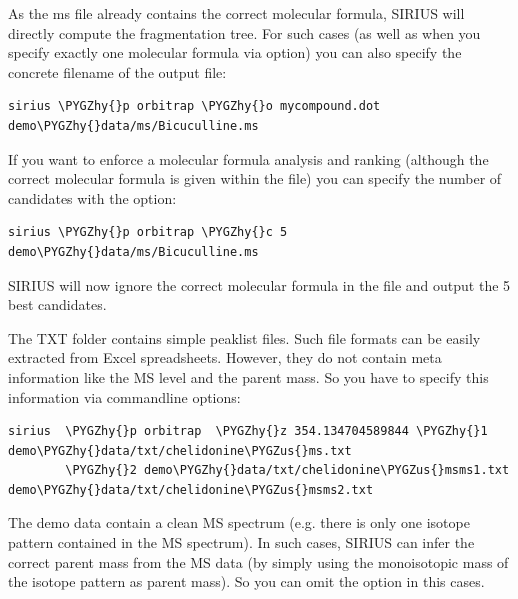 \documentclass[letterpaper,10pt,openany,oneside]{sphinxmanual}
\def\PYGZus{\char`\_}
\def\PYGZhy{\char`\-}
\begin{document}
As the ms file already contains the correct molecular formula, SIRIUS will
directly compute the fragmentation tree. For such cases (as well as when you
specify exactly one molecular formula via  option) you can also
specify the concrete filename of the output file:

\begin{Verbatim}[commandchars=\\\{\}]
sirius \PYGZhy{}p orbitrap \PYGZhy{}o mycompound.dot demo\PYGZhy{}data/ms/Bicuculline.ms
\end{Verbatim}

If you want to enforce a molecular formula analysis and ranking (although the correct molecular formula is given within the file) you can specify the number of candidates with the  option:

\begin{Verbatim}[commandchars=\\\{\}]
sirius \PYGZhy{}p orbitrap \PYGZhy{}c 5 demo\PYGZhy{}data/ms/Bicuculline.ms
\end{Verbatim}

SIRIUS will now ignore the correct molecular formula in the file and output the 5 best candidates.

The TXT folder contains simple peaklist files. Such file formats can be easily extracted from Excel spreadsheets. However, they do not contain meta information like the MS level and the parent mass. So you have to specify this information via commandline options:

\begin{Verbatim}[commandchars=\\\{\}]
sirius  \PYGZhy{}p orbitrap  \PYGZhy{}z 354.134704589844 \PYGZhy{}1 demo\PYGZhy{}data/txt/chelidonine\PYGZus{}ms.txt
        \PYGZhy{}2 demo\PYGZhy{}data/txt/chelidonine\PYGZus{}msms1.txt demo\PYGZhy{}data/txt/chelidonine\PYGZus{}msms2.txt
\end{Verbatim}

The demo data contain a clean MS spectrum (e.g. there is only one isotope pattern contained in the MS spectrum). In such cases, SIRIUS can infer the correct parent mass from the MS data (by simply using the monoisotopic mass of the isotope pattern as parent mass). So you can omit the  option in this cases.

\end{document}
